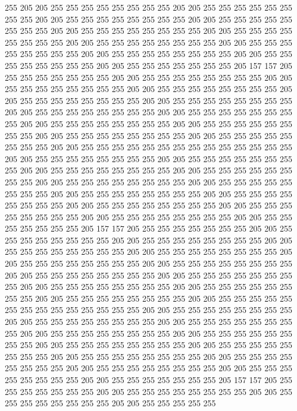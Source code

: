 255 205 205 255 255 255 255 255 255 255 255 205 205 255 255 255 255 255 255 255
255 205 205 255 255 255 255 255 255 255 255 205 205 255 255 255 255 255 255 255
255 205 205 255 255 255 255 255 255 255 255 205 205 255 255 255 255 255 255 255
255 205 205 255 255 255 255 255 255 255 255 205 205 255 255 255 255 255 255 255
255 205 205 255 255 255 255 255 255 255 255 205 205 255 255 255 255 255 255 255
255 205 205 255 255 255 255 255 255 255 205 157 157 205 255 255 255 255 255 255
255 205 205 255 255 255 255 255 255 255 255 205 205 255 255 255 255 255 255 255
255 205 205 255 255 255 255 255 255 255 255 205 205 255 255 255 255 255 255 255
255 205 205 255 255 255 255 255 255 255 255 205 205 255 255 255 255 255 255 255
255 205 205 255 255 255 255 255 255 255 255 205 205 255 255 255 255 255 255 255
255 205 205 255 255 255 255 255 255 255 255 205 205 255 255 255 255 255 255 255
255 205 205 255 255 255 255 255 255 255 255 205 205 255 255 255 255 255 255 255
255 255 255 255 255 255 255 205 205 255 255 255 255 255 255 255 255 205 205 255
255 255 255 255 255 255 255 205 205 255 255 255 255 255 255 255 255 205 205 255
255 255 255 255 255 255 255 205 205 255 255 255 255 255 255 255 255 205 205 255
255 255 255 255 255 255 255 205 205 255 255 255 255 255 255 255 255 205 205 255
255 255 255 255 255 255 255 205 205 255 255 255 255 255 255 255 255 205 205 255
255 255 255 255 255 255 255 205 205 255 255 255 255 255 255 255 255 205 205 255
255 255 255 255 255 255 205 157 157 205 255 255 255 255 255 255 255 205 205 255
255 255 255 255 255 255 255 205 205 255 255 255 255 255 255 255 255 205 205 255
255 255 255 255 255 255 255 205 205 255 255 255 255 255 255 255 255 205 205 255
255 255 255 255 255 255 255 205 205 255 255 255 255 255 255 255 255 205 205 255
255 255 255 255 255 255 255 205 205 255 255 255 255 255 255 255 255 205 205 255
255 255 255 255 255 255 255 205 205 255 255 255 255 255 255 255 255 205 205 255
255 255 255 255 255 255 255 205 205 255 255 255 255 255 255 255 255 255 255 255
255 255 255 205 205 255 255 255 255 255 255 255 255 205 205 255 255 255 255 255
255 255 255 205 205 255 255 255 255 255 255 255 255 205 205 255 255 255 255 255
255 255 255 205 205 255 255 255 255 255 255 255 255 205 205 255 255 255 255 255
255 255 255 205 205 255 255 255 255 255 255 255 255 205 205 255 255 255 255 255
255 255 255 205 205 255 255 255 255 255 255 255 255 205 205 255 255 255 255 255
255 255 255 205 205 255 255 255 255 255 255 255 255 205 205 255 255 255 255 255
255 255 205 157 157 205 255 255 255 255 255 255 255 205 205 255 255 255 255 255
255 255 255 205 205 255 255 255 255 255 255 255 255 205 205 255 255 255 255 255
